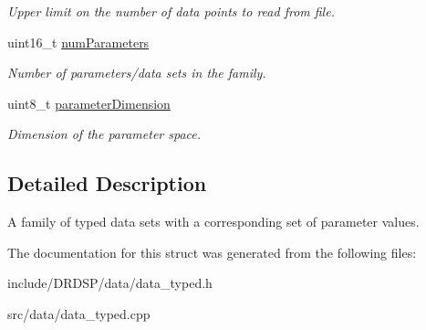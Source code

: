 \begin{DoxyCompactItemize}
\begin{DoxyCompactList}\small\item\em Upper limit on the number of data points to read from file. \end{DoxyCompactList}\item 
\hypertarget{struct_d_r_d_s_p_1_1_data_system_typed_a965e1066f9c4449413add3978a4cb0af}{uint16\-\_\-t \hyperlink{struct_d_r_d_s_p_1_1_data_system_typed_a965e1066f9c4449413add3978a4cb0af}{num\-Parameters}}\label{struct_d_r_d_s_p_1_1_data_system_typed_a965e1066f9c4449413add3978a4cb0af}

\begin{DoxyCompactList}\small\item\em Number of parameters/data sets in the family. \end{DoxyCompactList}\item 
\hypertarget{struct_d_r_d_s_p_1_1_data_system_typed_af3b60c8a97dc029652d551b7cdd34be4}{uint8\-\_\-t \hyperlink{struct_d_r_d_s_p_1_1_data_system_typed_af3b60c8a97dc029652d551b7cdd34be4}{parameter\-Dimension}}\label{struct_d_r_d_s_p_1_1_data_system_typed_af3b60c8a97dc029652d551b7cdd34be4}

\begin{DoxyCompactList}\small\item\em Dimension of the parameter space. \end{DoxyCompactList}\end{DoxyCompactItemize}


\subsection{Detailed Description}
A family of typed data sets with a corresponding set of parameter values. 

The documentation for this struct was generated from the following files\-:\begin{DoxyCompactItemize}
\item 
include/\-D\-R\-D\-S\-P/data/data\-\_\-typed.\-h\item 
src/data/data\-\_\-typed.\-cpp\end{DoxyCompactItemize}
